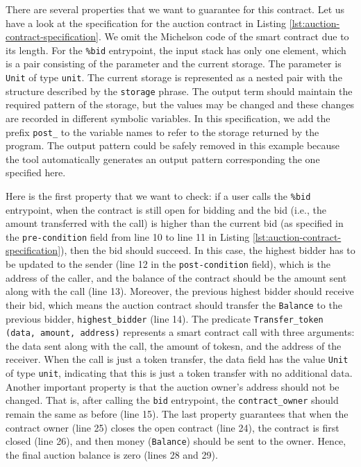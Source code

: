 \documentclass[a4paper,USenglish,cleveref, autoref, thm-restate]{lipics-v2021}
\begin{document}
There are several properties that we want to guarantee for this
contract. Let us have a look at the specification for the auction
contract in Listing \ref{lst:auction-contract-specification}. We omit
the Michelson code of the smart contract due to its length.  For the
\lstinline/%bid/ entrypoint, the input stack has only one element,
which is a pair consisting of the parameter and the current
storage. The parameter is \lstinline/Unit/ of type \lstinline/unit/.
The current storage is represented as a nested pair with the
structure described by the \lstinline|storage| phrase. 
The output term should maintain the required pattern of the storage,
but the values may be changed and these changes are recorded in
different symbolic variables. In this specification, we add the prefix
\lstinline/post_/ to the variable names to refer to the storage
returned by the program. The output pattern could be safely removed in
this example because the tool automatically generates an output
pattern corresponding the one specified here.

Here is the first property that we want to check: if a user calls the
\lstinline/%bid/ entrypoint, when the contract is still open for
bidding and the bid (i.e., the amount transferred with the call) is
higher than the current bid (as specified in the
\lstinline/pre-condition/ field from line 10 to line 11 in Listing
\ref{lst:auction-contract-specification}), then the bid should
succeed.  In this case, the highest bidder has to be updated to the
sender (line 12 in the \lstinline/post-condition/ field), which is the
address of the caller, and the balance of the contract should be the
amount sent along with the call (line 13). Moreover, the previous
highest bidder should receive their bid, which means the auction
contract should transfer the \lstinline/Balance/ to the previous
bidder, \lstinline/highest_bidder/ (line 14). 
The predicate \lstinline/Transfer_token (data, amount, address)/
represents a smart contract call with three arguments: the data sent
along with the call, the amount of tokesn, and the address of the
receiver.  When the call is just a token transfer, the data field has
the value \lstinline/Unit/ of type \lstinline/unit/, indicating that
this is just a token transfer with no additional data. Another
important property is that the auction owner's address should not be
changed. That is, after calling the \lstinline/bid/ entrypoint, the
\lstinline/contract_owner/ should remain the same as before (line
15). The last property guarantees that when the contract owner (line
25) closes the open contract (line 24), the contract is first closed
(line 26), and then money (\lstinline/Balance/) should be sent to the
owner. Hence, the final auction balance is zero (lines 28 and 29).
\end{document}
